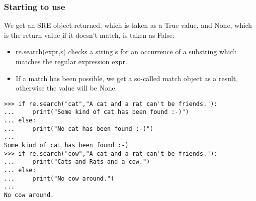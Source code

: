  \begin{frame}[fragile]
\frametitle{Starting to use}
We get an SRE object returned, which is taken as a True value, and None, which is the return value if it doesn't match, is taken as False:

\begin{itemize}
\item re.search(expr,s) checks a string s for an occurrence of a substring which matches the regular expression expr.
\item If a match has been possible, we get a so-called match object as a result, otherwise the value will be None.
\end{itemize}

\begin{lstlisting}
>>> if re.search("cat","A cat and a rat can't be friends."):
...     print("Some kind of cat has been found :-)")
... else:
...     print("No cat has been found :-)")
... 
Some kind of cat has been found :-)
>>> if re.search("cow","A cat and a rat can't be friends."):
...     print("Cats and Rats and a cow.")
... else:
...     print("No cow around.")
... 
No cow around.
\end{lstlisting}

\end{frame}
%
%



